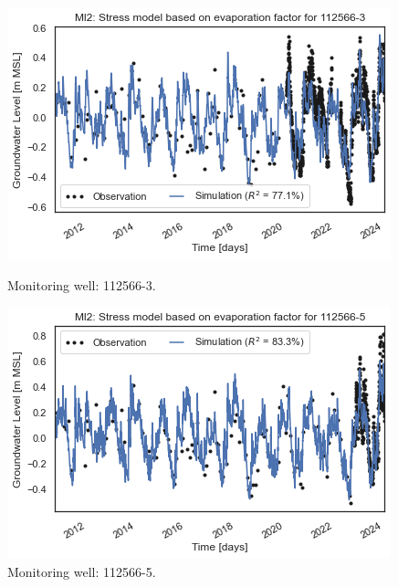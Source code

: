 \begin{figure}[htbp]
    \centering
    \begin{minipage}{0.32\textwidth}
        \centering
        \includegraphics[width=\linewidth]{frontmatter/Rozenburg-fig/1125663.png}
        \caption{Monitoring well: 112566-3.}
        \label{fig:112566-3.}
    \end{minipage}
    \hfill
    \begin{minipage}{0.32\textwidth}
        \centering
        \includegraphics[width=\linewidth]{frontmatter/Rozenburg-fig/1125665.png}
        \caption{Monitoring well: 112566-5.}
        \label{fig:112566-5}
    \end{minipage}
    \hfill
    \begin{minipage}{0.32\textwidth}
        \centering

\end{minipage}
\end{figure}
